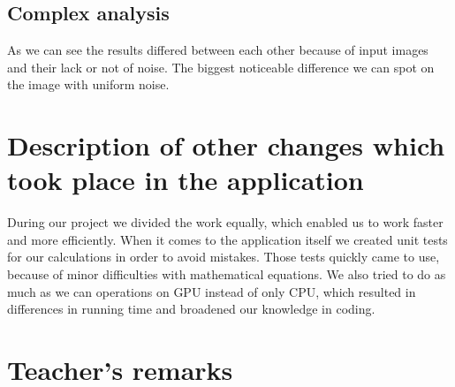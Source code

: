 \documentclass[12pt]{article}
\begin{document}
\subsection{Complex analysis}

As we can see the results differed between each other because of input images and their lack or not of noise. The biggest noticeable difference we can spot on the image with uniform noise.

\section{Description of other changes which took place in the application}

During our project we divided the work equally,
which enabled us to work faster and more efficiently.
When it comes to the application itself we created unit tests for our calculations in order to avoid mistakes.
Those tests quickly came to use, because of minor difficulties with mathematical equations.
We also tried to do as much as we can operations on GPU instead of only CPU,
which resulted in differences in running time and broadened our knowledge in coding.


\vfill
\section*{Teacher's remarks}
\begin{tabularx}{\textwidth}{|X|}
    \hline
    \vspace{7cm}
    \phantom{.} \\
    \hline
\end{tabularx}
\end{document}

